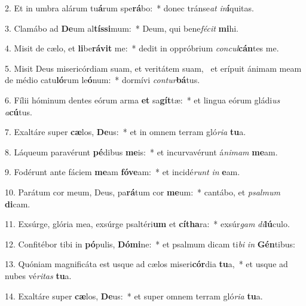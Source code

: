 2. Et in umbra alárum tu\textbf{á}rum spe\textbf{rá}bo:~*  donec tránse\textit{at} \textit{in}\textbf{í}quitas.\

3. Clamábo ad \textbf{De}um al\textbf{tís}\textbf{si}mum:~*  Deum, qui bene\textit{fé}\textit{cit} \textbf{mi}hi.\

4. Misit de cælo, et \textbf{li}be\textbf{rá}\textbf{vit} me:~*  dedit in oppróbrium \textit{con}\textit{cul}\textbf{cán}tes me.\

5. Misit Deus misericórdiam suam, et veritátem suam, \dag\  et erípuit ánimam meam de médio catu\textbf{ló}rum le\textbf{ó}num:~*  dormívi \textit{con}\textit{tur}\textbf{bá}tus.\

6. Fílii hóminum dentes eórum arma \textbf{et} sa\textbf{gít}tæ:~*  et lingua eórum gládi\textit{us} \textit{a}\textbf{cú}tus.\

7. Exaltáre super \textbf{cæ}los, \textbf{De}us:~*  et in omnem terram gló\textit{ri}\textit{a} \textbf{tu}a.\

8. Láqueum paravérunt \textbf{pé}dibus \textbf{me}is:~*  et incurvavérunt á\textit{ni}\textit{mam} \textbf{me}am.\

9. Fodérunt ante fáciem \textbf{me}am \textbf{fó}\textbf{ve}am:~*  et incidé\textit{runt} \textit{in} \textbf{e}am.\

10. Parátum cor meum, Deus, pa\textbf{rá}tum cor \textbf{me}um:~*  cantábo, et \textit{psal}\textit{mum} \textbf{di}cam.\

11. Exsúrge, glória mea, exsúrge psaltéri\textbf{um} et \textbf{cí}\textbf{tha}ra:~*  exsúr\textit{gam} \textit{di}\textbf{lú}culo.\

12. Confitébor tibi in \textbf{pó}pulis, \textbf{Dó}\textbf{mi}ne:~*  et psalmum dicam ti\textit{bi} \textit{in} \textbf{Gén}tibus:\

13. Quóniam magnificáta est usque ad cælos miseri\textbf{cór}dia \textbf{tu}a,~*  et usque ad nubes vé\textit{ri}\textit{tas} \textbf{tu}a.\

14. Exaltáre super \textbf{cæ}los, \textbf{De}us:~*  et super omnem terram gló\textit{ri}\textit{a} \textbf{tu}a.\

